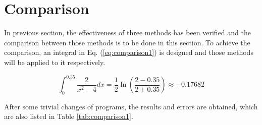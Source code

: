 \documentclass[preprint,12pt]{elsarticle}
\begin{document}
\section{Comparison}
\label{S:4}

In previous section, the effectiveness of three methods has been verified and the comparison between those methods is to be done in this section. To achieve the comparison, an integral in Eq. (\ref{eq:comparison1}) is designed and those methods will be applied to it respectively. 

\begin{equation}
\label{eq:comparison1}
    \int_{0}^{0.35} \frac{2}{x^{2}-4} dx = \frac{1}{2}\ln(\frac{2-0.35}{2+0.35}) \approx -0.17682
\end{equation}

After some trivial changes of programs, the results and errors are obtained, which are also listed in Table \ref{tab:comparison1}.
\end{document}
